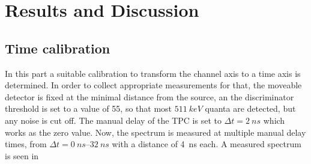 \chapter{Results and Discussion}

\section{Time calibration}

In this part a suitable calibration to transform the channel axis to a time axis is determined. In order to collect appropriate measurements for that, the moveable detector is fixed at the minimal distance from the source, an the discriminator threshold is set to a value of 55, so that most $\SI{511}{keV}$ quanta are detected, but any noise is cut off. The manual delay of the TPC is set to $\Delta t = \SI{2}{ns}$ which works as the zero value. Now, the spectrum is measured at multiple manual delay times, from $\Delta t = \SIrange[]{0}{32}{ns}$ with a distance of \SI{4}{ns} each. A measured spectrum is seen in 